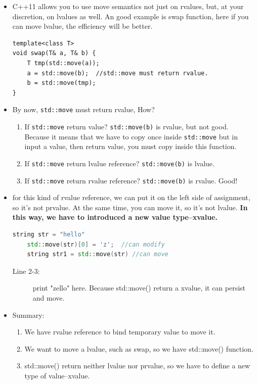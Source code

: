 \documentclass[a4paper,11pt,twoside]{book}
\begin{document}
\begin{itemize}
	\item C++11 allows you to use move semantics not just on rvalues, but, at your discretion, on lvalues as well. An good example is swap function, here if you can move lvalue, the efficiency will be better. 
	
\begin{lstlisting}[numbers=none]
template<class T> 
void swap(T& a, T& b) { 
	T tmp(std::move(a));
	a = std::move(b);  //std::move must return rvalue.
	b = std::move(tmp);
} 
\end{lstlisting}
	
	\item By now, \texttt{std::move} must return rvalue, How?
	\begin{enumerate}
		\item If \texttt{std::move} return  value? \texttt{std::move(b)} is rvalue, but not good. Because it means that we have to copy once inside \texttt{std::move} but in input a value, then return value, you must copy inside this function.
		
		\item If \texttt{std::move} return  lvalue reference? \texttt{std::move(b)} is lvalue. 
		
		\item If \texttt{std::move} return  rvalue reference? \texttt{std::move(b)} is rvalue. Good! 
	\end{enumerate} 

	
\item for this kind of rvalue reference, we can put it on the left side of assignment, so it's not prvalue. At the same time, you can move it, so it's not lvalue.  \textbf{In this way, we have to introduced a new value type--xvalue.}    
\begin{lstlisting}[frame=single, language=c++, mathescape=true]
	string str = "hello"
	std::move(str)[0] = 'z';  //can modify
	string str1 = std::move(str) //can move
\end{lstlisting}
\begin{description}
	\item[Line 2-3:] print "zello" here. Because std::move() return a xvalue, it can persist and move.
\end{description}
	

	
	\item Summary:
	\begin{enumerate}
		\item We have rvalue reference to bind temporary value to move it.
		\item We want to move a lvalue, such as swap, so we have std::move() function.
		\item std::move() return neither lvalue nor prvalue, so we have to define a new type of value--xvalue.
	\end{enumerate}
	

\end{itemize}
\end{document}
